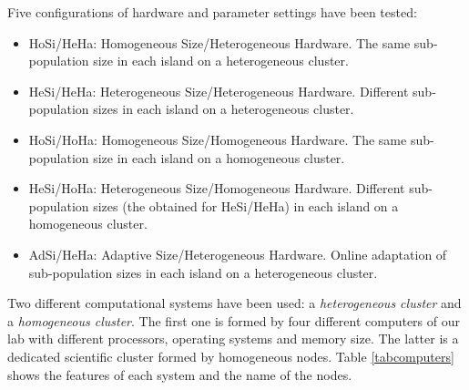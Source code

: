 \documentclass[final,1p,times]{elsarticle}
\begin{document}
Five configurations of hardware and parameter settings have been tested:


\begin{itemize}
\item HoSi/HeHa: Homogeneous Size/Heterogeneous Hardware. The same sub-population size in each island on a heterogeneous cluster.
\item HeSi/HeHa: Heterogeneous Size/Heterogeneous Hardware. Different sub-population sizes in each island on a heterogeneous cluster.
\item HoSi/HoHa: Homogeneous Size/Homogeneous Hardware. The same sub-population size in each island on a homogeneous cluster.
\item HeSi/HoHa: Heterogeneous Size/Homogeneous Hardware. Different sub-population sizes (the obtained for HeSi/HeHa) in each island on a homogeneous cluster.

\item AdSi/HeHa: Adaptive Size/Heterogeneous Hardware. Online adaptation of sub-population sizes in each island on a heterogeneous cluster.
\end{itemize}

Two different computational systems have been used: a {\em heterogeneous cluster} and a {\em homogeneous cluster}. The first one is formed by four different computers of our lab with different processors, operating systems and memory size. The latter is a dedicated scientific cluster formed by homogeneous nodes. Table \ref{tabcomputers} shows the features of each system and the name of the nodes.

\begin{table}
\end{table}
\end{document}
